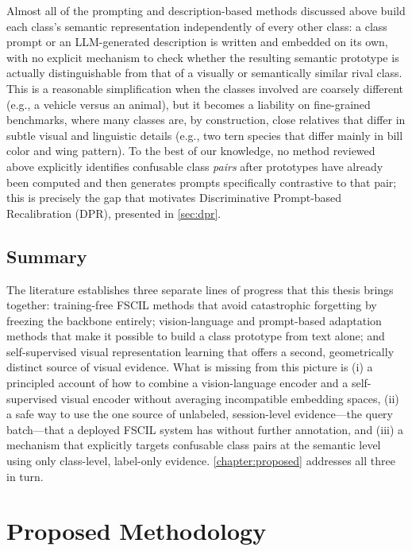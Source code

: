 \documentclass{iutbscthesis}
\begin{document}
Almost all of the prompting and description-based methods discussed above build each class's semantic representation independently of every other class: a class prompt or an LLM-generated description is written and embedded on its own, with no explicit mechanism to check whether the resulting semantic prototype is actually distinguishable from that of a visually or semantically similar rival class. This is a reasonable simplification when the classes involved are coarsely different (e.g., a vehicle versus an animal), but it becomes a liability on fine-grained benchmarks, where many classes are, by construction, close relatives that differ in subtle visual and linguistic details (e.g., two tern species that differ mainly in bill color and wing pattern). To the best of our knowledge, no method reviewed above explicitly identifies confusable class \emph{pairs} after prototypes have already been computed and then generates prompts specifically contrastive to that pair; this is precisely the gap that motivates Discriminative Prompt-based Recalibration (DPR), presented in \autoref{sec:dpr}.

\section{Summary}

The literature establishes three separate lines of progress that this thesis brings together: training-free FSCIL methods that avoid catastrophic forgetting by freezing the backbone entirely; vision-language and prompt-based adaptation methods that make it possible to build a class prototype from text alone; and self-supervised visual representation learning that offers a second, geometrically distinct source of visual evidence. What is missing from this picture is (i) a principled account of how to combine a vision-language encoder and a self-supervised visual encoder without averaging incompatible embedding spaces, (ii) a safe way to use the one source of unlabeled, session-level evidence---the query batch---that a deployed FSCIL system has without further annotation, and (iii) a mechanism that explicitly targets confusable class pairs at the semantic level using only class-level, label-only evidence. \autoref{chapter:proposed} addresses all three in turn.


\chapter{Proposed Methodology}
\label{chapter:proposed}
\end{document}
